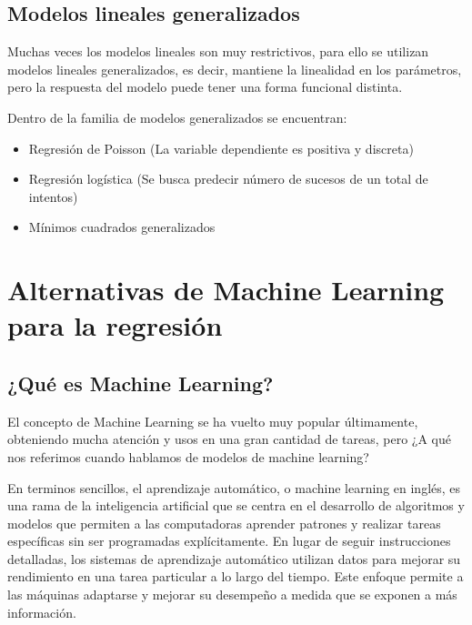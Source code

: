 \documentclass[
]{book}
\providecommand{\tightlist}{%
  \setlength{\itemsep}{0pt}\setlength{\parskip}{0pt}}
\begin{document}
\subsection{Modelos lineales generalizados}\label{modelos-lineales-generalizados}

Muchas veces los modelos lineales son muy restrictivos, para ello se
utilizan modelos lineales generalizados, es decir, mantiene la
linealidad en los parámetros, pero la respuesta del modelo puede tener
una forma funcional distinta.

Dentro de la familia de modelos generalizados se encuentran:

\begin{itemize}
\tightlist
\item
  Regresión de Poisson (La variable dependiente es positiva y
  discreta)
\item
  Regresión logística (Se busca predecir número de sucesos de un total
  de intentos)
\item
  Mínimos cuadrados generalizados
\end{itemize}

\section{Alternativas de Machine Learning para la regresión}\label{alternativas-de-machine-learning-para-la-regresiuxf3n}

\subsection{¿Qué es Machine Learning?}\label{quuxe9-es-machine-learning}

El concepto de Machine Learning se ha vuelto muy popular últimamente,
obteniendo mucha atención y usos en una gran cantidad de tareas, pero ¿A
qué nos referimos cuando hablamos de modelos de machine learning?

En terminos sencillos, el aprendizaje automático, o machine learning en
inglés, es una rama de la inteligencia artificial que se centra en el
desarrollo de algoritmos y modelos que permiten a las computadoras
aprender patrones y realizar tareas específicas sin ser programadas
explícitamente. En lugar de seguir instrucciones detalladas, los
sistemas de aprendizaje automático utilizan datos para mejorar su
rendimiento en una tarea particular a lo largo del tiempo. Este enfoque
permite a las máquinas adaptarse y mejorar su desempeño a medida que se
exponen a más información.
\end{document}
